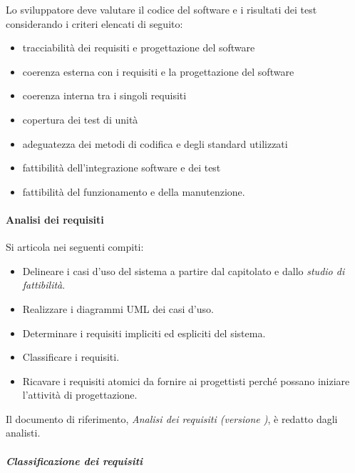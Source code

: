 \documentclass[../../norme-di-progetto.tex]{subfiles}
\begin{document}
Lo sviluppatore deve valutare il codice del software e i risultati dei test considerando i criteri elencati di seguito:

\begin{itemize}
  \item tracciabilità dei requisiti e progettazione del software
  \item coerenza esterna con i requisiti e la progettazione del software
  \item coerenza interna tra i singoli requisiti
  \item copertura dei test di unità
  \item adeguatezza dei metodi di codifica e degli standard utilizzati
  \item fattibilità dell'integrazione software e dei test
  \item fattibilità del funzionamento e della manutenzione.
\end{itemize}

\paragraph{Analisi dei requisiti}%
\label{par:analisi_dei_requisiti}

Si articola nei seguenti compiti:

\begin{itemize}
  \item Delineare i casi d'uso del sistema a partire dal capitolato e dallo \textit{studio di fattibilità}.
  \item Realizzare i diagrammi UML dei casi d'uso.
  \item Determinare i requisiti impliciti ed espliciti del sistema.
  \item Classificare i requisiti.
  \item Ricavare i requisiti atomici da fornire ai progettisti perché possano iniziare l'attività di progettazione.
\end{itemize}

Il documento di riferimento, \textit{Analisi dei requisiti (versione \versione)}, è redatto dagli analisti.

\subparagraph{Classificazione dei requisiti}%
\label{subp:classificazione_dei_requisiti}
\end{document}
